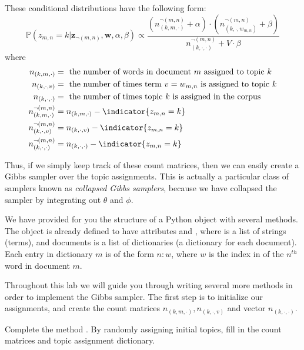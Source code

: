 These conditional distributions have the following form:
\begin{equation*}
\mathbb{P}(z_{m,n} = k | \mathbf{z}_{\neg (m,n)}, \mathbf{w}, \alpha, \beta) \propto \frac{(n_{(k,m,\cdot)}^{\neg (m,n)} + \alpha)\cdot(n_{(k, \cdot, w_{m,n})}^{\neg (m,n)} + \beta)}{n_{(k,\cdot,\cdot)}^{\neg (m,n)} + V \cdot \beta}
\end{equation*}
where 
\begin{align*}
n_{(k,m,\cdot)} & = \mbox{ the number of words in document $m$ assigned to topic $k$} \\
n_{(k,\cdot,v)} & = \mbox{ the number of times term $v = w_{m,n}$ is assigned to topic $k$} \\
n_{(k,\cdot,\cdot)} & = \mbox{ the number of times topic $k$ is assigned in the corpus} \\
n_{(k,m,\cdot)}^{\neg (m,n)} & = n_{(k,m,\cdot)} - \indicator{z_{m,n} = k} \\
n_{(k,\cdot,v)}^{\neg (m,n)} & = n_{(k,\cdot,v)} - \indicator{z_{m,n} = k} \\
n_{(k,\cdot,\cdot)}^{\neg (m,n)} & = n_{(k,\cdot,\cdot)} - \indicator{z_{m,n} = k}
\end{align*}

Thus, if we simply keep track of these count matrices, then we can easily create a Gibbs sampler over the topic assignments. This is actually a particular class of samplers known as \emph{collapsed Gibbs samplers}, because we have collapsed the sampler by integrating out $\theta$ and $\phi$.

We have provided for you the structure of a Python object  with several methods. The object is already defined to have attributes  and , where  is a list of strings (terms), and documents is a list of dictionaries (a dictionary for each document). Each entry in dictionary $m$ is of the form $n : w$, where $w$ is the index in  of the $n^{th}$ word in document $m$.

Throughout this lab we will guide you through writing several more methods in order to implement the Gibbs sampler. The first step is to initialize our assignments, and create the count matrices $n_{(k,m,\cdot)}, n_{(k,\cdot,v)}$ and vector $n_{(k,\cdot,\cdot)}$.

\begin{problem}
Complete the method . By randomly assigning initial topics, fill in the count matrices and topic assignment dictionary.
\end{problem}

